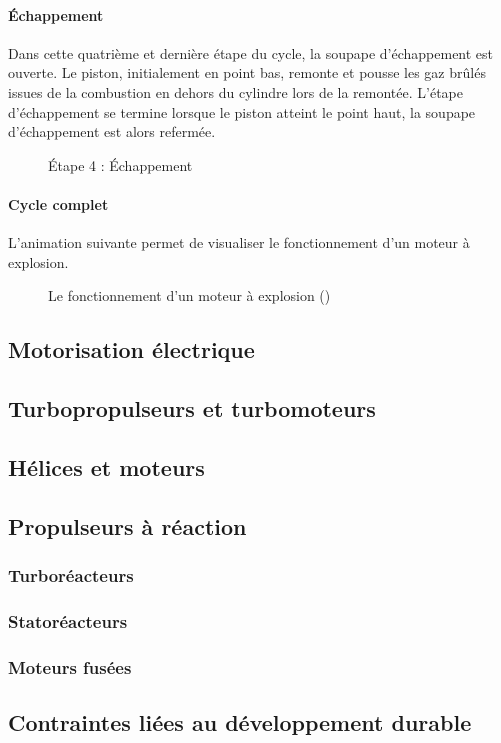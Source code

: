		
		\paragraph{Échappement}
		
		Dans cette quatrième et dernière étape du cycle, la soupape d'échappement est ouverte. Le piston, initialement en point bas, remonte et pousse les gaz brûlés issues de la combustion en dehors du cylindre lors de la remontée. L'étape d'échappement se termine lorsque le piston atteint le point haut, la soupape d'échappement est alors refermée.
		
		\begin{figure}[H]
  		\centering
		
  		\caption{Étape 4 : Échappement}
		\end{figure}	
		
		\paragraph{Cycle complet}
		
		L'animation suivante permet de visualiser le fonctionnement d'un moteur à explosion.	
		
		\renewcommand{\echelleTikz}{0.5}
		\begin{figure}[H]
  		\centering
		
  		\caption{Le fonctionnement d'un moteur à explosion (\cite{tikz::schemaMoteurPistonAnime})}
		\end{figure}	
	
	
	\subsection{Motorisation électrique}
	
	\subsection{Turbopropulseurs et turbomoteurs}
	
	\subsection{Hélices et moteurs}
	
	\subsection{Propulseurs à réaction}
		\subsubsection{Turboréacteurs}
	
		\subsubsection{Statoréacteurs}
	
		\subsubsection{Moteurs fusées}
		
	\subsection{Contraintes liées au développement durable}
